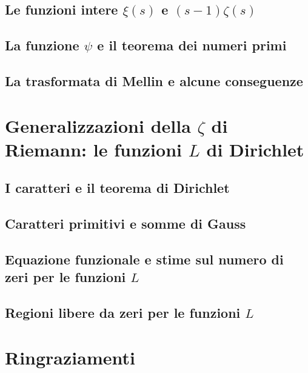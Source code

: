 \documentclass{article}
\begin{document}
\subsection{Le funzioni intere $\xi(s)$ e $(s-1)\zeta(s)$}


\subsection{La funzione $\psi$ e il teorema dei numeri primi}


\subsection{La trasformata di Mellin e alcune conseguenze}


\newpage

\section{Generalizzazioni della $\zeta$ di Riemann: le funzioni $L$ di Dirichlet}

\subsection{I caratteri e il teorema di Dirichlet}


\subsection{Caratteri primitivi e somme di Gauss}


\subsection{Equazione funzionale e stime sul numero di zeri per le funzioni $L$}


\subsection{Regioni libere da zeri per le funzioni $L$}


\newpage



\section*{Ringraziamenti}

\end{document}
